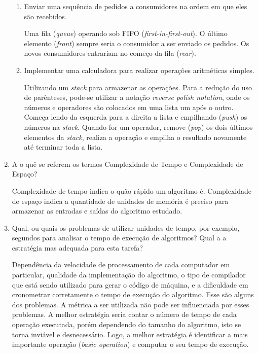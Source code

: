 \documentclass[12pt,a4paper]{article}
\begin{document}
\begin{enumerate}
\begin{enumerate}
		\item Enviar uma sequência de pedidos a consumidores na ordem em que eles são recebidos.
		
		Uma fila (\textit{queue}) operando sob FIFO (\textit{first-in-first-out}). O último elemento (\textit{front}) sempre seria o consumidor a ser enviado os pedidos. Os novos consumidores entrariam no começo da fila (\textit{rear}).
		
		\item Implementar uma calculadora para realizar operações aritméticas simples.
		
		Utilizando um \textit{stack} para armazenar as operações. Para a redução do uso de parênteses, pode-se utilizar a notação \textit{reverse polish notation}, onde os números e operadores são colocados em uma lista um após o outro. Começa lendo da esquerda para a direita a lista e empilhando (\textit{push}) os números na \textit{stack}. Quando for um operador, remove (\textit{pop}) os dois últimos elementos da \textit{stack}, realiza a operação e empilha o resultado novamente até terminar toda a lista.		
		
	\end{enumerate}


	\item A o quê se referem os termos Complexidade de Tempo e Complexidade de Espaço?
	
	Complexidade de tempo indica o quão rápido um algoritmo é. Complexidade de espaço indica a quantidade de unidades de memória é preciso para armazenar as entradas e saídas do algoritmo estudado.	
	
	
	\item Qual, ou quais os problemas de utilizar unidades de tempo, por exemplo, segundos para analisar	o tempo de execução de algoritmos? Qual a a estratégia mas adequada para esta tarefa?
	
	Dependência da velocidade de processamento de cada computador em particular, qualidade da implementação do algoritmo, o tipo de compilador que está sendo utilizado para gerar o código de máquina, e a dificuldade em cronometrar corretamente o tempo de execução do algoritmo. Esse são alguns dos problemas. A métrica a ser utilizada não pode ser influenciada por esses problemas. A melhor estratégia seria contar o número de tempo de cada operação executada, porém dependendo do tamanho do algoritmo, isto se torna inviável e desnecessário. Logo, a melhor estratégia é identificar a mais importante operação (\textit{basic operation}) e computar o seu tempo de execução.    
	

\end{enumerate}
\end{document}
